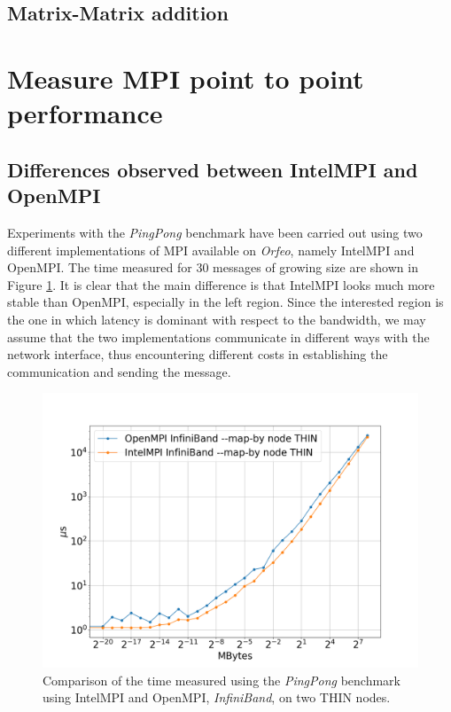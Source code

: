 \documentclass{article}
\begin{document}
\subsection{Matrix-Matrix addition}

\section{Measure MPI point to point performance}

\subsection{Differences observed between IntelMPI and OpenMPI}
Experiments with the \emph{PingPong} benchmark have been carried out using two different implementations of MPI available on \emph{Orfeo}, namely IntelMPI and OpenMPI. The time measured for 30 messages of growing size are shown in Figure \ref{fig:ompi_vs_intel}. It is clear that the main difference is that IntelMPI looks much more stable than OpenMPI, especially in the left region. Since the interested region is the one in which latency is dominant with respect to the bandwidth, we may assume that the two implementations communicate in different ways with the network interface, thus encountering different costs in establishing the communication and sending the message.

\begin{figure}[t]
    \centering
    \includegraphics[width=\textwidth]{benchmark/intel_vs_ompi_node.png}
    \caption{Comparison of the time measured using the \emph{PingPong} benchmark using IntelMPI and OpenMPI, \emph{InfiniBand}, on two THIN nodes.}
    \label{fig:ompi_vs_intel}
\end{figure}
\end{document}
